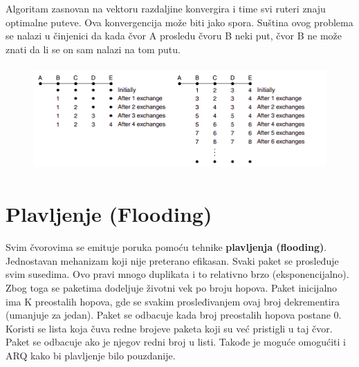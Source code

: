 \documentclass[a4paper]{article}
\begin{document}
        Algoritam zasnovan na vektoru razdaljine
        konvergira i time svi ruteri znaju optimalne puteve. Ova konvergencija može biti jako spora.
        Suština ovog problema se nalazi u činjenici da kada čvor A prosledu čvoru B neki put,
        čvor B ne može znati da li se on sam nalazi na tom putu.
        \begin{figure}[H]
            \begin{center}
                \includegraphics[width=120mm,height=40mm]{Slike/brojanje_do_beskonacnosti.png}
            \end{center}
        \end{figure}

\section{Plavljenje (Flooding)}
    Svim čvorovima se emituje poruka pomoću tehnike \textbf{plavljenja (flooding)}. Jednostavan mehanizam 
    koji nije preterano efikasan. Svaki paket se prosleđuje svim susedima. Ovo pravi
    mnogo duplikata i to relativno brzo (eksponencijalno). Zbog toga se paketima dodeljuje životni vek po broju
    hopova. Paket inicijalno ima K preostalih hopova, gde se svakim prosleđivanjem ovaj broj
    dekrementira (umanjuje za jedan). Paket se odbacuje kada broj preostalih hopova postane 0. \\
    \indent Koristi se lista koja čuva redne brojeve paketa koji su već                     pristigli u taj
    čvor. Paket se odbacuje ako je njegov redni broj u listi. Takođe je moguće omogućiti 
    i ARQ kako bi plavljenje bilo pouzdanije. 
\end{document}
